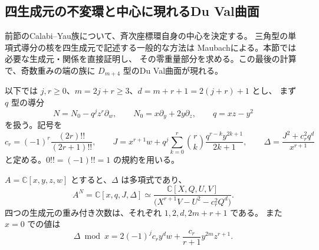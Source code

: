 \subsection{四生成元の不変環と中心に現れるDu Val曲面}
\label{subsec:affine-polynomial-center-v34}

前節のCalabi--Yau族について、斉次座標環自身の中心を決定する。
三角型の単項式導分の核を四生成元で記述する一般的な方法は
Maubach\cite{Maubach2000}による。本節では必要な生成元・関係を直接証明し、
その零重量部分を求める。この最後の計算で、奇数重みの端の族に
$D_{m+4}$ 型のDu Val曲面が現れる。

以下では $j,r\ge0$、$m=2j+r\ge3$、$d=m+r+1=2(j+r)+1$ とし、
まず $q$ 型の導分
\[
 N=N_0-q^jz^r\partial_w,\qquad N_0=x\partial_y+2y\partial_z,
 \qquad q=xz-y^2
\]
を扱う。記号を
\[
 c_r=(-1)^r\frac{(2r)!!}{(2r+1)!!},\qquad
 J=x^{r+1}w+q^j\sum_{k=0}^r\binom rk
                   \frac{q^{r-k}y^{2k+1}}{2k+1},\qquad
 \Delta=\frac{J^2+c_r^2q^d}{x^{r+1}}
\]
と定める。$0!!=(-1)!!=1$ の規約を用いる。

\begin{proposition}[多項式不変環の全体]
\label{prop:affine-invariant-ring-v34}
$A=\mathbb C[x,y,z,w]$ とすると、$\Delta$ は多項式であり、
\[
 \boxed{
 A^N=\mathbb C[x,q,J,\Delta]
 \simeq\frac{\mathbb C[X,Q,U,V]}
 {\bigl(X^{r+1}V-U^2-c_r^2Q^d\bigr)}.
 }
\]
四つの生成元の重み付き次数は、それぞれ $1,2,d,2m+r+1$ である。
また $x=0$ での値は
\begin{equation}
 \Delta\bmod x
 =2(-1)^jc_r y^d w+\frac{c_r}{r+1}y^{2m}z^{r+1}.
 \label{eq:Delta-specialization-v34}
\end{equation}
\end{proposition}

